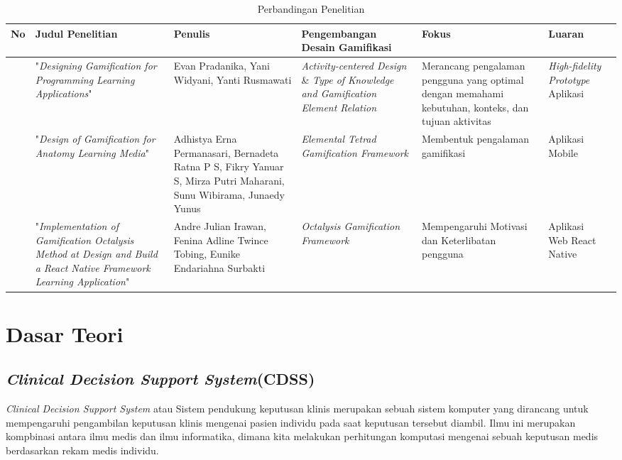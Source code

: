 \begin{landscape}
	\begin{table}[htbp]
	\caption{Perbandingan Penelitian}
	\centering
	\begin{tabular}{|>{\centering\arraybackslash}m{0.5cm}|m{4cm}|m{3.5cm}|m{4.5cm}|m{4.5cm}|m{4cm}|m{4cm}|}
		\hline
		\centering \textbf{No} & \centering \textbf{Judul Penelitian} & \centering \textbf{Penulis} & \centering  \textbf{Pengembangan Desain Gamifikasi} &\centering\textbf{Fokus}&\multicolumn{1}{m{4cm}|}{\centering\textbf{Luaran}} \\
		\hline 
		1 & "\textit{Designing Gamification for Programming Learning Applications}"
		& 
		Evan Pradanika, Yani Widyani,  Yanti Rusmawati
		& \textit{Activity-centered Design} \& \textit{Type of Knowledge and Gamification Element Relation}& Merancang pengalaman pengguna yang optimal dengan memahami kebutuhan, konteks, dan tujuan aktivitas& \textit{High-fidelity Prototype} Aplikasi\\
		\hline
		2 &"\textit{Design of Gamification for Anatomy Learning Media}" 
		& 
		Adhistya Erna Permanasari, Bernadeta Ratna P S, Fikry Yanuar S, Mirza Putri Maharani, Sunu Wibirama, Junaedy Yunus
		& \textit{Elemental Tetrad Gamification Framework} & Membentuk pengalaman gamifikasi & Aplikasi Mobile\\
		\hline
		3 & 
		"\textit{Implementation of Gamification Octalysis Method at Design and Build a React Native Framework Learning Application}" 
		& 
		Andre Julian Irawan, Fenina Adline Twince Tobing, Eunike Endariahna Surbakti
		& \textit{Octalysis Gamification Framework}& Mempengaruhi Motivasi dan Keterlibatan pengguna & Aplikasi Web React Native\\
		\hline
	  \end{tabular}
	  \label{Tab: Tabel perbandingan metode}
	\end{table}
\end{landscape}

\newpage
\section{Dasar Teori}
\subsection{\textit{Clinical Decision Support System}(CDSS)}
\textit{Clinical Decision Support System} atau Sistem pendukung keputusan klinis merupakan sebuah sistem komputer yang dirancang untuk mempengaruhi pengambilan keputusan klinis mengenai pasien individu pada saat keputusan tersebut diambil\cite{sutton2020overview}.
Ilmu ini merupakan kompbinasi antara ilmu medis dan ilmu informatika, dimana kita melakukan perhitungan komputasi mengenai sebuah keputusan medis berdasarkan rekam medis individu.
